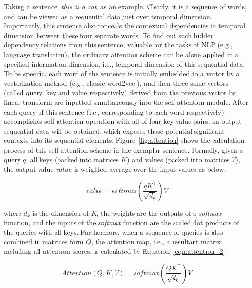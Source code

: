 Taking a sentence: \textit{this is a cat}, as an example. Clearly, it is a sequence of words, and can be viewed as a sequential data just over temporal dimension. Importantly, this sentence also conceals the contextual dependencies in temporal dimension between these four separate words. To find out such hidden dependency relations from this sentence, valuable for the tasks of NLP (e.g., language translation), the ordinary attention scheme can be alone applied in a specified information dimension, i.e., temporal dimension of this sequential data. To be specific, each word of the sentence is initially embedded to a vector by a vectorization method (e.g., classic word2vec \cite{church2017word2vec}), and then three same vectors (called query, key and value respectively) derived from the previous vector by linear transform are inputted simultaneously into the self-attention module. After each query of this sentence (i.e., corresponding to each word respectively) accomplishes self-attention operation with all of four key-value pairs, an output sequential data will be obtained, which exposes those potential significant contexts into its sequential elements. Figure~\ref{fig:attention} shows the calculation process of this self-attention scheme in the exemplar sentence. Formally, given a query $q$, all keys (packed into matrices $K$) and values (packed into matrices $V$), the output value $value$ is weighted average over the input values as below.

\begin{equation}
    \label{eqn:attention_1}
    value = softmax(\frac{q K^\top}{\sqrt{d_k}}) V
\end{equation}

where $d_k$ is the dimension of $K$, the weights are the outputs of a \textit{softmax} function, and the inputs of the \textit{softmax} function are the scaled dot products of the queries with all keys. Furthermore, when a sequence of queries is also combined in matrices form $Q$, the attention map, i.e., a resultant matrix including all attention scores, is calculated by Equation~\ref{eqn:attention_2}.

\begin{equation}
    \label{eqn:attention_2}
    Attention(Q,K,V) = softmax(\frac{Q K^\top}{\sqrt{d_k}}) V
\end{equation}

